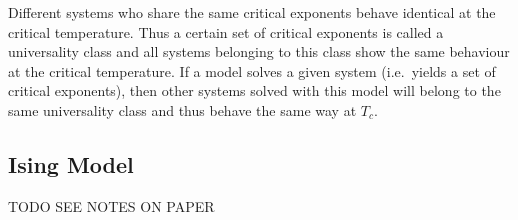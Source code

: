 \documentclass[a4paper,10pt]{article}
\numberwithin{equation}{section}
\begin{document}
\begin{multicols}{2}
Different systems who share the same critical exponents behave identical at the critical temperature.
Thus a certain set of critical exponents is called a universality class and all systems belonging to this class show the same behaviour at the critical temperature.
If a model solves a given system (i.e.\ yields a set of critical exponents), then other systems solved with this model will belong to the same universality class and thus behave the same way at $T_c$.

\subsection{Ising Model}
TODO SEE NOTES ON PAPER


\end{multicols}

%
%
\end{document}
